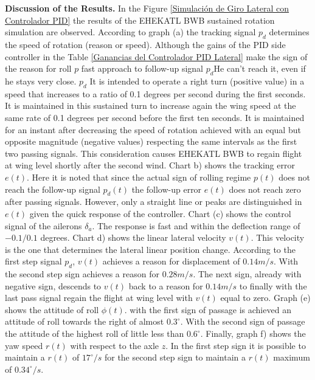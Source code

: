 \textbf{Discussion of the Results.} In the Figure \ref{Simulación de Giro Lateral con Controlador PID} the results of the EHEKATL BWB sustained rotation simulation are observed.
%
According to graph (a) the tracking signal $p_d$ determines the speed of rotation (reason or speed). Although the gains of the PID side controller in the Table \ref{Ganancias del Controlador PID Lateral}  make the sign of the reason for roll $p$ fast approach to follow-up signal $p_d$He can't reach it, even if he stays very close. $p_d$ It is intended to operate a right turn (positive value) in a speed that increases to a ratio of 0.1 degrees per second during the first seconds. It is maintained in this sustained turn to increase again the wing speed at the same rate of 0.1 degrees per second before the first ten seconds. It is maintained for an instant after decreasing the speed of rotation achieved with an equal but opposite magnitude (negative values) respecting the same intervals as the first two passing signals. This consideration causes EHEKATL BWB to regain flight at wing level shortly after the second wind. 
%
Chart b) shows the tracking error $e(t)$. Here it is noted that since the actual sign of rolling regime $p(t)$ does not reach the follow-up signal $p_d(t)$ the follow-up error $e(t)$ does not reach zero after passing signals. However, only a straight line or peaks are distinguished in $e(t)$ given the quick response of the controller. 
%
Chart (c) shows the control signal of the ailerons $\delta_a$. The response is fast and within the deflection range of $-0.1 / 0.1$ degrees. 
%
Chart d) shows the linear lateral velocity $v(t)$. This velocity is the one that determines the lateral linear position change. According to the first step signal $p_d$, $v(t)$ achieves a reason for displacement of $0.14m/s$. With the second step sign achieves a reason for $0.28m/s$. The next sign, already with negative sign, descends to $v(t)$ back to a reason for  $0.14m/s$ to finally with the last pass signal regain the flight at wing level with $v(t)$ equal to zero. 
%
Graph (e) shows the attitude of roll $\phi(t)$. with the first sign of passage is achieved an attitude of roll towards the right of almost $0.3 ^\circ$. With the second sign of passage the attitude of the highest roll of little less than $0.6 ^\circ$. 
%
Finally, graph f) shows the yaw speed $r(t)$ with respect to the axle $z$. In the first step sign it is possible to maintain a $r(t)$ of $17 ^\circ/s$ for the second step sign to maintain a $r(t)$ maximum of $0.34 ^\circ/s$.


\bigskip

